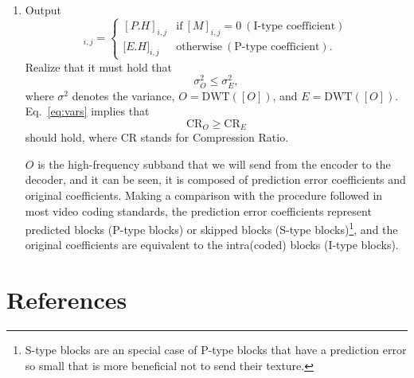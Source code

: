 \begin{enumerate}
\item Output
  \begin{equation}
    [O]_{i,j} = \left\{
      \begin{array}{ll}
        [P.H]_{i,j} & \text{if}~[M]_{i,j} = 0~(\text{I-type~coefficient})\\
        {[}E.H{]}_{i,j} & \text{otherwise}~(\text{P-type~coefficient}).
      \end{array}
    \right.
    \label{eq:output}
  \end{equation}
  Realize that it must hold that
  \begin{equation}
    \sigma^2_O \le \sigma^2_E,
    \label{eq:vars}
  \end{equation}
  where $\sigma^2$ denotes the variance, $O=\text{DWT}([O])$, and
  $E=\text{DWT}([O])$. Eq.~\ref{eq:vars} implies that
  \begin{equation}
    \text{CR}_O \ge \text{CR}_E
    \label{eq:crs}
  \end{equation}
  should hold, where CR stands for Compression Ratio.

  $O$ is the high-frequency subband that we will send from the
  encoder to the decoder, and it can be seen, it is composed of
  prediction error coefficients and original coefficients. Making a
  comparison with the procedure followed in most video coding
  standards, the prediction error coefficients represent predicted
  blocks (P-type blocks) or skipped blocks (S-type
  blocks)\footnote{S-type blocks are an special case of P-type blocks
  that have a prediction error so small that is more beneficial not to
  send their texture.}, and the original coefficients are equivalent
  to the intra(coded) blocks (I-type blocks).
\end{enumerate}

\section{References}

\renewcommand{\addcontentsline}[3]{}%




